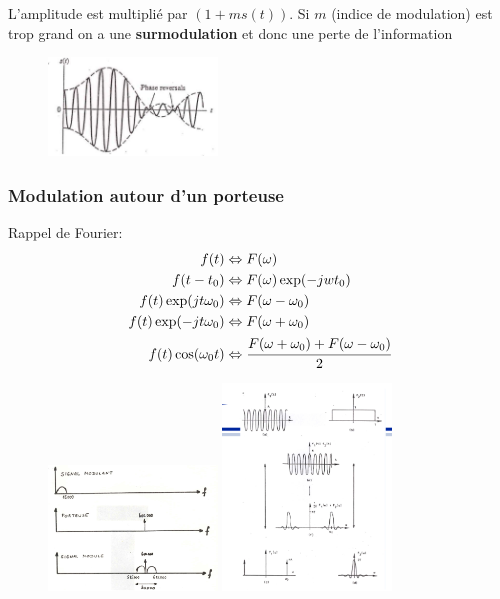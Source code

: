 \documentclass[12pt]{article}
\begin{document}
		L'amplitude est multiplié par $(1+ms(t))$. Si $m$ (indice de modulation) est trop grand on a une \textbf{surmodulation} et donc une perte de l'information
		\begin{figure}[htp]
			\centering
			\includegraphics[width=0.4\textwidth]{img/surmodulation.png}
		\end{figure}
		
		\subsubsection{Modulation autour d'un porteuse}
			Rappel de Fourier:
			\begin{equation} \label{eq1}
			\begin{split}
				f(t) &\Leftrightarrow F(\omega)\\
				f(t-t_0) & \Leftrightarrow F(\omega) \exp(-jwt_0)\\
				f(t) \exp(jt\omega_0) &\Leftrightarrow F(\omega - \omega_0)\\
				f(t) \exp(-jt\omega_0) &\Leftrightarrow F(\omega + \omega_0)\\
				f(t) \cos(\omega_0 t) &\Leftrightarrow \cfrac{F(\omega + \omega_0) + F(\omega - \omega_0)}{2}
			\end{split}
		\end{equation}
		
		\begin{figure}[htp]
			\centering
			\includegraphics[width=0.4\textwidth]{img/modulationAM1.png}
			\includegraphics[width=0.4\textwidth]{img/modulationAM2.png}

		\end{figure}
			
\end{document}
